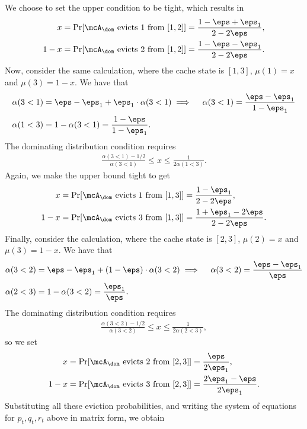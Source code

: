 We choose to set the upper condition to be tight, which results in
\begin{align*}
    x &= \Pr[\text{$\mcA_\dom$ evicts 1 from }[1,2]] = \frac{1-\eps+\eps_1}{2-2\eps}, \\
    1-x &= \Pr[\text{$\mcA_\dom$ evicts 2 from }[1,2]] = \frac{1-\eps-\eps_1}{2-2\eps}.
\end{align*}
Now, consider the same calculation, where the cache state is $[1,3]$, $\mu(1)=x$ and $\mu(3)=1-x$. We have that
\begin{align*}
    \alpha(3<1) &= \eps-\eps_1 + \eps_1 \cdot \alpha(3<1) \implies\quad \alpha(3<1) = \frac{\eps-\eps_1}{1-\eps_1} \\
    \alpha(1<3) &= 1-\alpha(3<1) = \frac{1-\eps}{1-\eps_1}.
\end{align*}
The dominating distribution condition requires
\begin{align*} 
    \frac{\alpha(3<1)-1/2}{\alpha(3<1)} \le x \le \frac{1}{2\alpha(1<3)}.
\end{align*}
Again, we make the upper bound tight to get
\begin{align*}
    x &= \Pr[\text{$\mcA_\dom$ evicts 1 from }[1,3]] = \frac{1-\eps_1}{2-2\eps}, \\
    1-x &= \Pr[\text{$\mcA_\dom$ evicts 3 from }[1,3]] = \frac{1+\eps_1-2\eps}{2-2\eps}.
\end{align*}
Finally, consider the calculation, where the cache state is $[2,3]$, $\mu(2)=x$ and $\mu(3)=1-x$. We have that
\begin{align*}
    \alpha(3<2) &= \eps-\eps_1 + (1-\eps) \cdot \alpha(3<2) \implies\quad \alpha(3<2) = \frac{\eps-\eps_1}{\eps} \\
    \alpha(2<3) &= 1-\alpha(3<2) = \frac{\eps_1}{\eps}.
\end{align*}
The dominating distribution condition requires
\begin{align*} 
    \frac{\alpha(3<2)-1/2}{\alpha(3<2)} \le x \le \frac{1}{2\alpha(2<3)},
\end{align*}
so we set
\begin{align*}
    x &= \Pr[\text{$\mcA_\dom$ evicts 2 from }[2,3]] = \frac{\eps}{2\eps_1}, \\
    1-x &= \Pr[\text{$\mcA_\dom$ evicts 3 from }[2,3]] = \frac{2\eps_1-\eps}{2\eps_1}.
\end{align*}
Substituting all these eviction probabilities, and writing the system of equations for $p_t,q_t,r_t$ above in matrix form, we obtain
